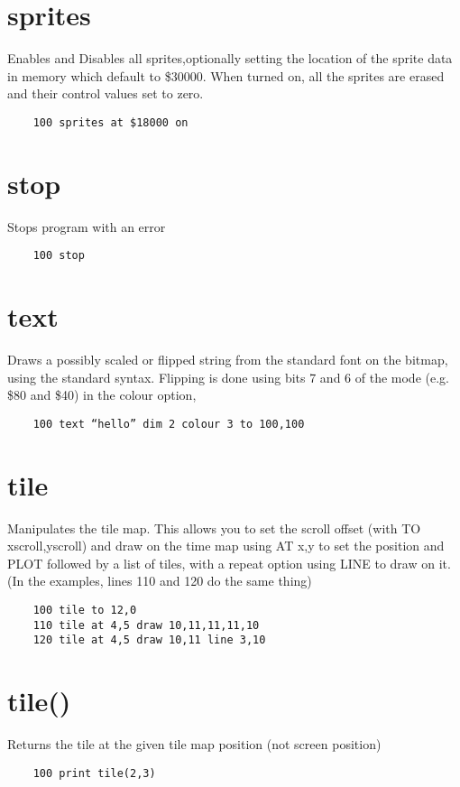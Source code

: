 \section*{sprites}
Enables and Disables all sprites,optionally setting the location of the sprite data in memory which default to \$30000. When turned on, all the sprites are erased and their control values set to zero.
\example{}
\begin{verbatim}
	100 sprites at $18000 on
\end{verbatim}

\section*{stop}
Stops program with an error
\example{}
\begin{verbatim}
	100 stop
\end{verbatim}

\section*{text}
Draws a possibly scaled or flipped string from the standard font on the bitmap, using the standard syntax. Flipping is done using bits 7 and 6 of the mode (e.g. \$80 and \$40) in the colour option, 
\example{}
\begin{verbatim}
	100 text “hello” dim 2 colour 3 to 100,100
\end{verbatim}

\section*{tile}
Manipulates the tile map. This allows you to set the scroll offset (with TO xscroll,yscroll) and draw on the time map using AT x,y to set the position and PLOT followed by a list of tiles, with a repeat option using LINE to draw on it. (In the examples, lines 110 and 120 do the same thing)
\example{}
\begin{verbatim}
	100 tile to 12,0
	110 tile at 4,5 draw 10,11,11,11,10
	120 tile at 4,5 draw 10,11 line 3,10
\end{verbatim}

\section*{tile()}
Returns the tile at the given tile map position (not screen position)
\example{}
\begin{verbatim}
	100 print tile(2,3)
\end{verbatim}

